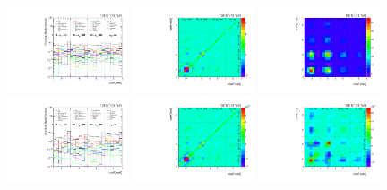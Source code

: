 \begin{figure}[htb]
\begin{center}
 \includegraphics[width=0.32\textwidth]{fig_fullRun2UL/unfolding/combined/deltaSystCombinedlog_rebinnedB_c_kk_mttbar.pdf}
 \includegraphics[width=0.32\textwidth]{fig_fullRun2UL/unfolding/combined/StatCovMatrix_rebinnedB_c_kk_mttbar.pdf}
 \includegraphics[width=0.32\textwidth]{fig_fullRun2UL/unfolding/combined/TotalSystCovMatrix_rebinnedB_c_kk_mttbar.pdf} \\
 \includegraphics[width=0.32\textwidth]{fig_fullRun2UL/unfolding/combined/deltaSystCombinedlogNorm_rebinnedB_c_kk_mttbar.pdf}
 \includegraphics[width=0.32\textwidth]{fig_fullRun2UL/unfolding/combined/StatCovMatrixNorm_rebinnedB_c_kk_mttbar.pdf}
 \includegraphics[width=0.32\textwidth]{fig_fullRun2UL/unfolding/combined/TotalSystCovMatrixNorm_rebinnedB_c_kk_mttbar.pdf} \\

\end{center}
\end{figure}
